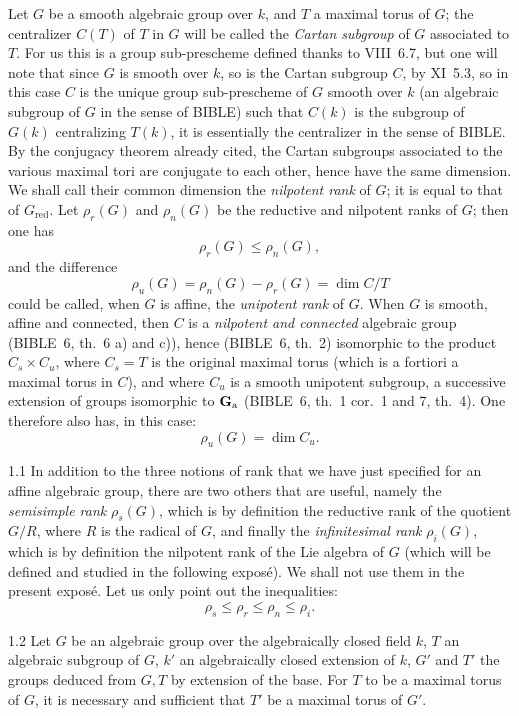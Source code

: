 Let $G$ be a smooth algebraic group over $k$, and $T$ a maximal torus of $G$; the centralizer $C(T)$ of $T$ in $G$ will be called the \emph{Cartan subgroup} of $G$ associated to $T$. For us this is a group sub-prescheme defined thanks to VIII~6.7, but one will note that since $G$ is smooth over $k$, so is the Cartan subgroup $C$, by XI~5.3, so in this case $C$ is the unique group sub-prescheme of $G$ smooth over $k$ (\ie an algebraic subgroup of $G$ in the sense of BIBLE) such that $C(k)$ is the subgroup of $G(k)$ centralizing $T(k)$, \ie it is essentially the centralizer in the sense of BIBLE. By the conjugacy theorem already cited, the Cartan subgroups associated to the various maximal tori are conjugate to each other, hence have the same dimension. We shall call their common dimension the \emph{nilpotent rank} of $G$; it is equal to that of $G_{\mathrm{red}}$. Let $\rho_r(G)$ and $\rho_n(G)$ be the reductive and nilpotent ranks of $G$; then one has
\[
\rho_r(G)\le\rho_n(G),
\]
and the difference
\[
\rho_u(G)=\rho_n(G)-\rho_r(G)=\dim C/T
\]
could be called, when $G$ is affine, the \emph{unipotent rank} of $G$. When $G$ is smooth, affine and connected, then $C$ is a \emph{nilpotent and connected} algebraic group (BIBLE~6, th.~6 a) and c)), hence (BIBLE~6, th.~2) isomorphic to the product $C_s\times C_u$, where $C_s=T$ is the original maximal torus (which is a fortiori a maximal torus in $C$), and where $C_u$ is a smooth unipotent subgroup, \ie a successive extension of groups isomorphic to $\mathbf{G}_{\mathrm{a}}$ (BIBLE~6, th.~1 cor.~1 and 7, th.~4). One therefore also has, in this case:
\[
\rho_u(G)=\dim C_u.
\]
\begin{remark}{1.1}\label{XII.1.1}
In addition to the three notions of rank that we have just specified for an affine algebraic group, there are two others that are useful, namely the \emph{semisimple rank} $\rho_s(G)$, which is by definition the reductive rank of the quotient $G/R$, where $R$ is the radical of $G$, and finally the \emph{infinitesimal rank} $\rho_i(G)$, which is by definition the nilpotent rank of the Lie algebra of $G$ (which will be defined and studied in the following exposé). We shall not use them in the present exposé. Let us only point out the inequalities:
\[
\rho_s\le\rho_r\le\rho_n\le\rho_i.
\]
\end{remark}
\begin{lemma}{1.2}\label{XII.1.2}
Let $G$ be an algebraic group over the algebraically closed field $k$, $T$ an algebraic subgroup of $G$, $k'$ an algebraically closed extension of $k$, $G'$ and $T'$ the groups deduced from $G,T$ by extension of the base. For $T$ to be a maximal torus of $G$, it is necessary and sufficient that $T'$ be a maximal torus of $G'$.
\end{lemma}

